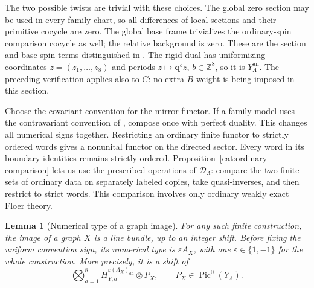 \documentclass[11pt]{article}
\newtheorem{lemma}[theorem]{Lemma}
\theoremstyle{definition}
\theoremstyle{remark}
\newcommand{\Z}{\mathbb Z}
\newcommand{\qnov}{\mathbf q}
\DeclareMathOperator{\Pic}{Pic}
\numberwithin{equation}{section}
\begin{document}
The two possible twists are trivial with these choices.  The global
zero section may be used in every family chart, so all differences of
local sections and their primitive cocycle are zero.  The global
base frame trivializes the ordinary-spin comparison cocycle as well;
the relative background is zero.  These are the section and base-spin
terms distinguished in \cite[Remark~2.16]{abouzaid-hms}.  The rigid dual
has uniformizing coordinates $z=(z_1,\ldots,z_8)$ and periods
$z\mapsto\qnov^b z$, $b\in\Z^8$, so it is $Y_\Lambda^{\mathrm{an}}$.
The preceding verification applies also to $C$: no extra $B$-weight is
being imposed in this section.

Choose the covariant convention for the mirror functor.  If a family
model uses the contravariant convention of
\cite[Equation~(1.1)]{abouzaid-hms}, compose once with perfect duality.
This changes all numerical signs together.  Restricting an ordinary
finite functor to strictly ordered words gives a nonunital functor on
the directed sector.  Every word in its boundary identities remains
strictly ordered.  Proposition~\ref{cat:ordinary-comparison} lets
us use the prescribed operations of $\mathcal D_\Lambda$: compare the
two finite sets of ordinary data on separately labeled copies, take
quasi-inverses, and then restrict to strict words.  This comparison
involves only ordinary weakly exact Floer theory.

\begin{lemma}[Numerical type of a graph image]
\label{mirror:graph-image}
For any such finite construction, the image of a graph $X$ is a line
bundle, up to an integer shift.  Before fixing the uniform convention
sign, its numerical type is $\varepsilon A_X$, with one
$\varepsilon\in\{1,-1\}$ for the whole construction.  More precisely,
it is a shift of
\[
 \bigotimes_{a=1}^8H_{Y,a}^{\varepsilon(A_X)_{aa}}\otimes P_X,
 \qquad P_X\in\Pic^0(Y_\Lambda).
\]
\end{lemma}
\end{document}
